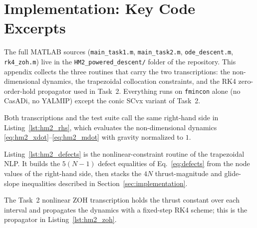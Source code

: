 \documentclass[../main.tex]{subfiles}
\begin{document}
\section{Implementation: Key Code Excerpts}\label{sec:appendix_code}

The full MATLAB sources (\texttt{main\_task1.m}, \texttt{main\_task2.m}, \texttt{ode\_descent.m}, \texttt{rk4\_zoh.m}) live in the \texttt{HM2\_powered\_descent/} folder of the repository. This appendix collects the three routines that carry the two transcriptions: the non-dimensional dynamics, the trapezoidal collocation constraints, and the RK4 zero-order-hold propagator used in Task~2. Everything runs on \texttt{fmincon} alone (no CasADi, no YALMIP) except the conic SCvx variant of Task~2.

Both transcriptions and the test suite call the same right-hand side in Listing~\ref{lst:hm2_rhs}, which evaluates the non-dimensional dynamics \eqref{eq:hm2_xdot}--\eqref{eq:hm2_mdot} with gravity normalized to $1$.



Listing~\ref{lst:hm2_defects} is the nonlinear-constraint routine of the trapezoidal NLP. It builds the $5(N-1)$ defect equalities of Eq.~\eqref{eq:defects} from the node values of the right-hand side, then stacks the $4N$ thrust-magnitude and glide-slope inequalities described in Section~\ref{sec:implementation}.



The Task~2 nonlinear ZOH transcription holds the thrust constant over each interval and propagates the dynamics with a fixed-step RK4 scheme; this is the propagator in Listing~\ref{lst:hm2_zoh}.


\end{document}
